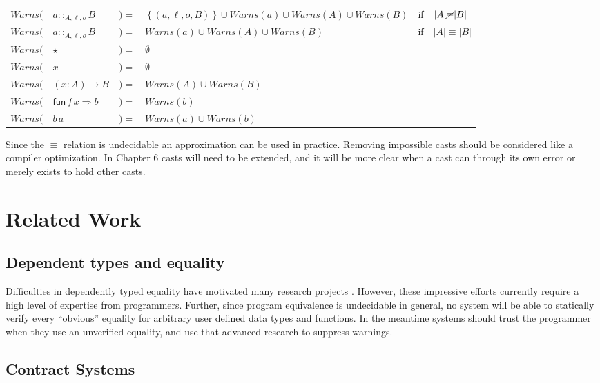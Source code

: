 
\begin{tabular}{llllll}
$Warns($ & $a::_{A,\ensuremath{\ell},o}B$ & $)=$ & $\left\{ (a,\ensuremath{\ell},o,B)\right\} \cup Warns(a)\cup Warns(A)\cup Warns(B)$ & if & $|A|\cancel{\equiv}|B|$\tabularnewline
$Warns($ & $a::_{A,\ensuremath{\ell},o}B$ & $)=$ & $Warns(a)\cup Warns(A)\cup Warns(B)$ & if & $|A|\equiv|B|$\tabularnewline
$Warns($ & $\star$ & $)=$ & $\emptyset$ &  & \tabularnewline
$Warns($ & $x$ & $)=$ & $\emptyset$ &  & \tabularnewline
$Warns($ & $\left(x:A\right)\rightarrow B$ & $)=$ & $Warns(A)\cup Warns(B)$ &  & \tabularnewline
$Warns($ & $\mathsf{fun}\,f\,x\Rightarrow b$ & $)=$ & $Warns(b)$ &  & \tabularnewline
$Warns($ & $b\,a$ & $)=$ & $Warns(a)\cup Warns(b)$ &  & \tabularnewline
\end{tabular}

Since the $\equiv$ relation is undecidable an approximation can be
used in practice. Removing impossible casts should be considered like
a compiler optimization. In Chapter 6 casts will need to be extended,
and it will be more clear when a cast can through its own error or
merely exists to hold other casts.

\section{Related Work}

\subsection{Dependent types and equality}


Difficulties in dependently typed equality have motivated many research
projects \cite{HoTTbook,sjoberg2015programming,cockx2021taming}.
However, these impressive efforts currently require a high level of
expertise from programmers. Further, since program equivalence is
undecidable in general, no system will be able to statically verify
every ``obvious'' equality for arbitrary user defined data types
and functions. In the meantime systems should trust the programmer
when they use an unverified equality, and use that advanced research
to suppress warnings. 

\subsection{Contract Systems}

